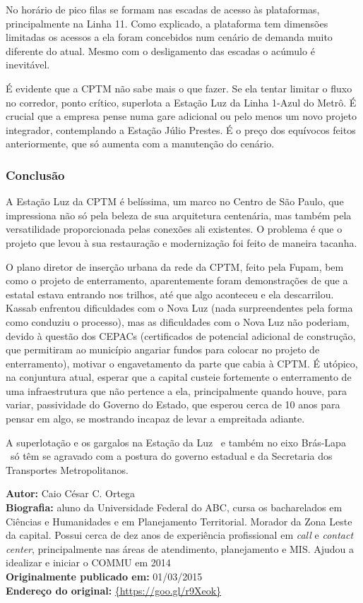 \documentclass[11pt,fleqn]{book} %
\newcommand{\infocaio}[2]{\textbf{Autor:} Caio C\'{e}sar C. Ortega \\ \textbf{Biografia:} aluno da Universidade Federal do ABC, cursa os bacharelados em Ci\^{e}ncias e Humanidades e em Planejamento Territorial. Morador da Zona Leste da capital. Possui cerca de dez anos de experi\^{e}ncia profissional em \textit{call} e \textit{contact center}, principalmente nas \'{a}reas de atendimento, planejamento e MIS. Ajudou a idealizar e iniciar o COMMU em 2014 \\ \textbf{Originalmente publicado em:} {#1} \\ \textbf{Endere\c{c}o do original:} \url{{#2}}}
\begin{document}
No horário de pico filas se formam nas escadas de acesso às plataformas, principalmente na Linha 11. Como explicado, a plataforma tem dimensões limitadas os acessos a ela foram concebidos num cenário de demanda muito diferente do atual. Mesmo com o desligamento das escadas o acúmulo é inevitável.

É evidente que a CPTM não sabe mais o que fazer. Se ela tentar limitar o fluxo no corredor, ponto crítico, superlota a Estação Luz da Linha 1-Azul do Metrô. É crucial que a empresa pense numa gare adicional ou pelo menos um novo projeto integrador, contemplando a Estação Júlio Prestes. É o preço dos equívocos feitos anteriormente, que só aumenta com a manutenção do cenário.

\subsubsection{Conclusão}

A Estação Luz da CPTM é belíssima, um marco no Centro de São Paulo, que impressiona não só pela beleza de sua arquitetura centenária, mas também pela versatilidade proporcionada pelas conexões ali existentes. O problema é que o projeto que levou à sua restauração e modernização foi feito de maneira tacanha.

O plano diretor de inserção urbana da rede da CPTM, feito pela Fupam, bem como o projeto de enterramento, aparentemente foram demonstrações de que a estatal estava entrando nos trilhos, até que algo aconteceu e ela descarrilou. Kassab enfrentou dificuldades com o Nova Luz (nada surpreendentes pela forma como conduziu o processo), mas as dificuldades com o Nova Luz não poderiam, devido à questão dos CEPACs (certificados de potencial adicional de construção, que permitiram ao município angariar fundos para colocar no projeto de enterramento), motivar o engavetamento da parte que cabia à CPTM. É utópico, na conjuntura atual, esperar que a capital custeie fortemente o enterramento de uma infraestrutura que não pertence a ela, principalmente quando houve, para variar, passividade do Governo do Estado, que esperou cerca de 10 anos para pensar em algo, se mostrando incapaz de levar a empreitada adiante.

A superlotação e os gargalos na Estação da Luz \textemdash\ e também no eixo Brás-Lapa \textemdash\ só têm se agravado com a postura do governo estadual e da Secretaria dos Transportes Metropolitanos.

\begin{info}
	\infocaio{01/03/2015}{https://goo.gl/r9Xeok}
\end{info}
\end{document}
